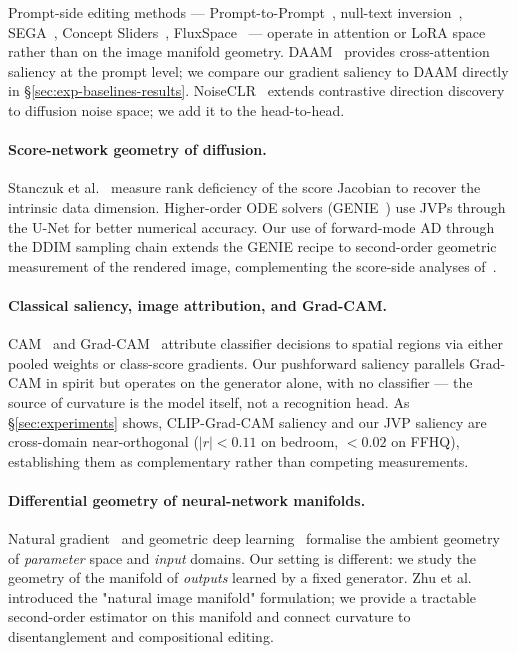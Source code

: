 Prompt-side editing methods --- Prompt-to-Prompt~\cite{Hertz2023P2P},
null-text inversion~\cite{Mokady2023NullText},
SEGA~\cite{Brack2023SEGA}, Concept
Sliders~\cite{Gandikota2024ConceptSliders},
FluxSpace~\cite{Dalva2025FluxSpace} --- operate in attention or
LoRA space rather than on the image manifold geometry.
DAAM~\cite{Tang2023DAAM} provides cross-attention saliency at the
prompt level; we compare our gradient saliency to DAAM directly in
\S\ref{sec:exp-baselines-results}.
NoiseCLR~\cite{Dalva2024NoiseCLR} extends contrastive direction
discovery to diffusion noise space; we add it to the head-to-head.

\paragraph{Score-network geometry of diffusion.}
Stanczuk et al.~\cite{Stanczuk2024IntrinsicDim} measure rank
deficiency of the score Jacobian to recover the intrinsic data
dimension. Higher-order ODE solvers
(GENIE~\cite{Dockhorn2022GENIE}) use JVPs through the U-Net for
better numerical accuracy. Our use of forward-mode AD through the
DDIM sampling chain extends the GENIE recipe to second-order
geometric measurement of the rendered image, complementing the
score-side analyses of~\cite{Stanczuk2024IntrinsicDim}.

\paragraph{Classical saliency, image attribution, and Grad-CAM.}
CAM~\cite{Zhou2016CAM} and Grad-CAM~\cite{Selvaraju2017GradCAM}
attribute classifier decisions to spatial regions via either pooled
weights or class-score gradients. Our pushforward saliency parallels
Grad-CAM in spirit but operates on the generator alone, with no
classifier --- the source of curvature is the model itself, not a
recognition head. As §\ref{sec:experiments} shows, CLIP-Grad-CAM
saliency and our JVP saliency are cross-domain near-orthogonal
($|r| < 0.11$ on bedroom, $< 0.02$ on FFHQ), establishing them as
complementary rather than competing measurements.

\paragraph{Differential geometry of neural-network manifolds.}
Natural gradient~\cite{Amari1998NaturalGradient} and geometric deep
learning~\cite{Bronstein2021GeometricDL} formalise the ambient
geometry of \emph{parameter} space and \emph{input} domains. Our
setting is different: we study the geometry of the manifold of
\emph{outputs} learned by a fixed generator. Zhu et
al.~\cite{Zhu2016ManipulationOnManifold} introduced the "natural
image manifold" formulation; we provide a tractable second-order
estimator on this manifold and connect curvature to disentanglement
and compositional editing.

